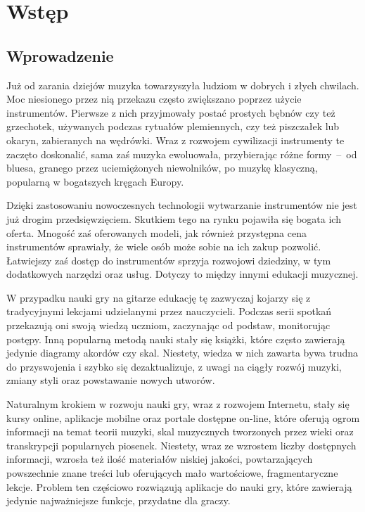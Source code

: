 \chapter{Wstęp}

\section{Wprowadzenie}
Już od zarania dziejów muzyka towarzyszyła ludziom w dobrych i złych chwilach. Moc niesionego przez nią przekazu często zwiększano poprzez użycie instrumentów. Pierwsze z nich przyjmowały postać prostych bębnów czy też grzechotek, używanych podczas rytuałów plemiennych, czy też piszczałek lub okaryn, zabieranych na wędrówki. Wraz z rozwojem cywilizacji instrumenty te zaczęto doskonalić, sama zaś muzyka ewoluowała, przybierając różne formy~--~od bluesa, granego przez uciemiężonych niewolników, po muzykę klasyczną, popularną w bogatszych kręgach Europy. 


Dzięki zastosowaniu nowoczesnych technologii wytwarzanie instrumentów nie jest już drogim przedsięwzięciem. Skutkiem tego na rynku pojawiła się bogata ich oferta. Mnogość zaś oferowanych modeli, jak również przystępna cena  instrumentów sprawiały, że wiele osób może sobie na ich zakup pozwolić. Łatwiejszy zaś dostęp do instrumentów sprzyja rozwojowi dziedziny, w tym dodatkowych narzędzi oraz usług. Dotyczy to między innymi edukacji muzycznej.

W przypadku nauki gry na gitarze edukację tę zazwyczaj kojarzy się z tradycyjnymi lekcjami udzielanymi przez nauczycieli. Podczas serii spotkań przekazują oni swoją wiedzą uczniom, zaczynając od podstaw, monitorując postępy. Inną popularną metodą nauki stały się książki, które często zawierają jedynie diagramy akordów czy skal. Niestety, wiedza w nich zawarta bywa trudna do przyswojenia i szybko się dezaktualizuje, z uwagi na ciągły rozwój muzyki, zmiany styli oraz powstawanie nowych utworów.

Naturalnym krokiem w rozwoju nauki gry, wraz z rozwojem Internetu, stały się kursy online, aplikacje mobilne oraz portale dostępne on-line, które oferują ogrom informacji na temat teorii muzyki, skal muzycznych tworzonych przez wieki oraz transkrypcji popularnych piosenek. Niestety, wraz ze wzrostem liczby dostępnych informacji, wzrosła też ilość materiałów niskiej jakości, powtarzających powszechnie znane treści lub oferujących mało wartościowe, fragmentaryczne lekcje. Problem ten częściowo rozwiązują aplikacje do nauki gry, które zawierają jedynie najważniejsze funkcje, przydatne dla graczy.

